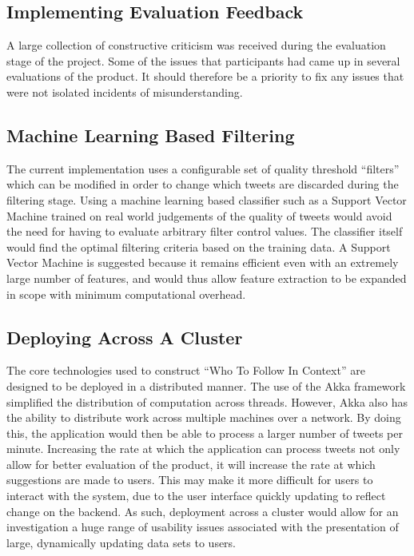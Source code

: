 \documentclass{l4proj}
\begin{document}
        \subsection{Implementing Evaluation Feedback}
        A large collection of constructive criticism was received during the evaluation stage of the project. Some of the issues that participants had came up in several evaluations of the product. It should therefore be a priority to fix any issues that were not isolated incidents of misunderstanding.
        
        \subsection{Machine Learning Based Filtering}
        The current implementation uses a configurable set of quality threshold ``filters'' which can be modified in order to change which tweets are discarded during the filtering stage. Using a machine learning based classifier such as a Support Vector Machine trained on real world judgements of the quality of tweets would avoid the need for having to evaluate arbitrary filter control values. The classifier itself would find the optimal filtering criteria based on the training data. A Support Vector Machine is suggested because it remains efficient even with an extremely large number of features, and would thus allow feature extraction to be expanded in scope with minimum computational overhead.
        
        \subsection{Deploying Across A Cluster}
        The core technologies used to construct ``Who To Follow In Context'' are designed to be deployed in a distributed manner. The use of the Akka framework simplified the distribution of computation across threads. However, Akka also has the ability to distribute work across multiple machines over a network. By doing this, the application would then be able to process a larger number of tweets per minute. Increasing the rate at which the application can process tweets not only allow for better evaluation of the product, it will increase the rate at which suggestions are made to users. This may make it more difficult for users to interact with the system, due to the user interface quickly updating to reflect change on the backend. As such, deployment across a cluster would allow for an investigation a huge range of usability issues associated with the presentation of large, dynamically updating data sets to users.
    
\end{document}
